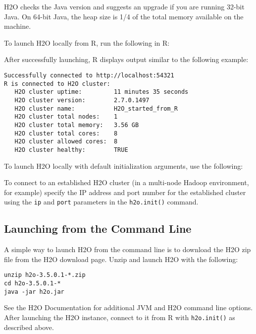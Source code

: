 {{H2O checks the Java version and suggests an upgrade if you are running 32-bit Java. On 64-bit Java, the heap size is 1/4 of the total memory available on the machine. 

\begin{minipage}{\textwidth}

To launch H2O locally from R, run the following in R:

\medskip
\waterExampleInR


After successfully launching, R displays output similar to the following example: 
\begin{lstlisting}[style=R]
Successfully connected to http://localhost:54321
R is connected to H2O cluster:
   H2O cluster uptime:         11 minutes 35 seconds
   H2O cluster version:        2.7.0.1497 
   H2O cluster name:           H2O_started_from_R
   H2O cluster total nodes:    1
   H2O cluster total memory:   3.56 GB
   H2O cluster total cores:    8
   H2O cluster allowed cores:  8
   H2O cluster healthy:        TRUE
\end{lstlisting}
\end{minipage}


To launch H2O locally with default initialization arguments, use the following:

\waterExampleInR
\medskip


\newpage

To connect to an established H2O cluster (in a multi-node Hadoop environment, for example) specify the IP address and port number for the established cluster using the \texttt{ip} and \texttt{port} parameters in the \texttt{h2o.init()} command.

\waterExampleInR
\medskip


\subsection{Launching from the Command Line}

A simple way to launch H2O from the command line is to download the H2O zip file from the H2O download page. Unzip and
launch H2O with the following:
\begin{lstlisting}[style=R]
unzip h2o-3.5.0.1-*.zip
cd h2o-3.5.0.1-*
java -jar h2o.jar
\end{lstlisting}
See the H2O Documentation for additional JVM and H2O command line options.
After launching the H2O instance, connect to it from R with {\texttt{h2o.init()}} as described above.

}}
